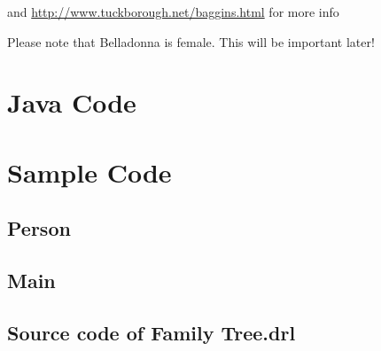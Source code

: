 and \href {http://www.tuckborough.net/baggins.html}
{http://www.tuckborough.net/baggins.html} for more info

Please note that \textcolor{CarnationPink} {Belladonna} is female.  This will be important later!



\section{Java Code}



\cleardoublepage
\section {Sample Code}
\subsection {Person}
\cleardoublepage
\subsection {Main}




\cleardoublepage
\subsection{Source code of Family Tree.drl}


